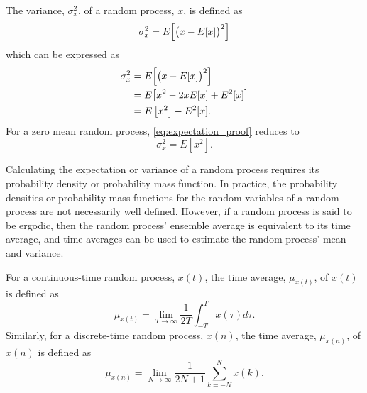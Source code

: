 The variance, $\sigma_x^2$, of a random process, $x$, is defined as
\begin{equation}\label{eq:variance}
\sigma_x^2=E\Bigl[\bigl(x-E[x]\bigr)^2\Bigr]
\end{equation}
which can be expressed as 
\begin{equation}\label{eq:expectation_proof}
\begin{split}
\sigma_x^2& =E\Bigl[\bigl(x-E[x]\bigr)^2\Bigr]\\
& = E\bigl[x^2 - 2xE[x]+E^2[x]\bigr]\\
& = E\left[x^2\right] - E^2[x]\text{.}
\end{split}
\end{equation}
For a zero mean random process, \eqref{eq:expectation_proof} reduces to
\begin{equation}\label{eq:zero_mean_variance}
\sigma_x^2=E\left[x^2\right]\text{.}
\end{equation}

Calculating the expectation or variance of a random process requires its probability
density or probability mass function. In practice, the probability densities or
probability mass functions for the random variables of a random process are not
necessarily well defined. However, if a random process is said to be ergodic, then the
random process' ensemble average is equivalent to
its time average, and time averages can be used to estimate the random process' mean and
variance\cite{papoulis_probability_1984}\cite{lathi_modern_1998}.

For a continuous-time random process, $x(t)$, the time average, $\mu_{x(t)}$, of $x(t)$ is
defined as 
\begin{equation}\label{eq:cont_time_average}
 \mu_{x(t)}=\displaystyle\lim_{T \to \infty}{\frac{1}{2T}}\int_{-T}^{T}{x(\tau)d\tau}.
\end{equation}
Similarly, for a discrete-time random process, $x(n)$, the time average, $\mu_{x(n)}$,
of $x(n)$ is defined as 
\begin{equation}\label{eq:discrete_time_average}
 \mu_{x(n)}=\displaystyle\lim_{N \to \infty}{\frac{1}{2N+1}}\sum_{k=-N}^{N}{x(k)}.
\end{equation}

